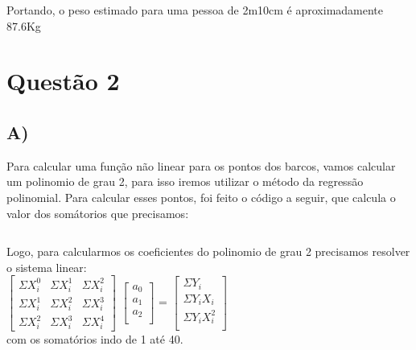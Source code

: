 \documentclass{article}
\begin{document}
    Portando, o peso estimado para uma pessoa de 2m10cm é aproximadamente 87.6Kg
    
\section*{Questão 2}
    \subsection*{A)}\hspace{0.5cm}Para calcular uma função não linear para os pontos dos barcos, vamos calcular um polinomio de grau 2, para isso iremos utilizar o método da regressão polinomial. Para calcular esses pontos, foi feito o código a seguir, que calcula o valor dos somátorios que precisamos:
    \inputminted[]{python}{questao2.py}
    Logo, para calcularmos os coeficientes do polinomio de grau 2 precisamos resolver o sistema linear:\\
    $\begin{bmatrix}
        \Sigma X_i^0 & \Sigma X_i^1 & \Sigma X_i^2\\
        \Sigma X_i^1 & \Sigma X_i^2 & \Sigma X_i^3\\
        \Sigma X_i^2 & \Sigma X_i^3 & \Sigma X_i^4
    \end{bmatrix}$
    $\begin{bmatrix}
        a_0\\
        a_1\\
        a_2\\
    \end{bmatrix}$
    = $\begin{bmatrix}
        \Sigma Y_i\\
        \Sigma Y_iX_i\\
        \Sigma Y_iX_i ^2\\
    \end{bmatrix}$\\
    com os somatórios indo de 1 até 40.
    
\end{document}
